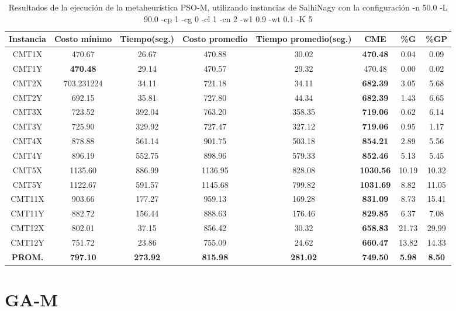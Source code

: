 \begin{table}[h]
\caption{Resultados de la ejecución de la metaheurística PSO-M, utilizando instancias de SalhiNagy con la configuración -n 50.0 -L 90.0 -cp 1 -cg 0 -cl 1 -cn 2 -w1 0.9 -wt 0.1 -K 5}
\centering
\small
\begin{tabular}{c c c c c c c c}
\hline\hline
Instancia & Costo mínimo & Tiempo(seg.) & Costo promedio & Tiempo promedio(seg.) & CME & \%G & \%GP \\ [0.5ex]
\hline
CMT1X & 470.67 & 26.67 & 
470.88 & 30.02 & \bf{470.48} & 
0.04 & 0.09\\CMT1Y & \bf{470.48} & 29.14 & 
470.57 & 29.32 & 470.48 & 0.00
 & 0.02\\CMT2X & 703.231224 & 34.11 & 
721.18 & 34.11 & \bf{682.39} & 
3.05 & 5.68\\CMT2Y & 692.15 & 35.81 & 
727.80 & 44.34 & \bf{682.39} & 
1.43 & 6.65\\CMT3X & 723.52 & 392.04 & 
763.20 & 358.35 & \bf{719.06} & 
0.62 & 6.14\\CMT3Y & 725.90 & 329.92 & 
727.47 & 327.12 & \bf{719.06} & 
0.95 & 1.17\\CMT4X & 878.88 & 561.14 & 
901.75 & 503.18 & \bf{854.21} & 
2.89 & 5.56\\CMT4Y & 896.19 & 552.75 & 
898.96 & 579.33 & \bf{852.46} & 
5.13 & 5.45\\CMT5X & 1135.60 & 886.99 & 
1136.95 & 828.08 & \bf{1030.56} & 
10.19 & 10.32\\CMT5Y & 1122.67 & 591.57 & 
1145.68 & 799.82 & \bf{1031.69} & 
8.82 & 11.05\\CMT11X & 903.66 & 177.27 & 
959.13 & 169.28 & \bf{831.09} & 
8.73 & 15.41\\CMT11Y & 882.72 & 156.44 & 
888.63 & 176.46 & \bf{829.85} & 
6.37 & 7.08\\CMT12X & 802.01 & 37.15 & 
856.42 & 30.32 & \bf{658.83} & 
21.73 & 29.99\\CMT12Y & 751.72 & 23.86 & 
755.09 & 24.62 & \bf{660.47} & 
13.82 & 14.33\\\bf{PROM.} & 
\bf{797.10} & \bf{273.92} & \bf{815.98} & \bf{281.02} & \bf{749.50} & \bf{5.98} & \bf{8.50}\\[1ex]\hline
\end{tabular}
\label{table:PSO-M-salhinagy}
\end{table}
\clearpage

\section{GA-M}\label{tablas-entonacion-GA-M}

